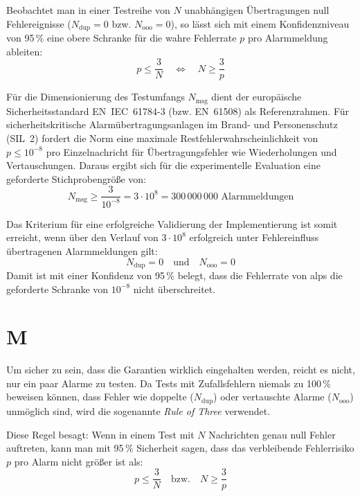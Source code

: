 Beobachtet man in einer Testreihe von $N$ unabhängigen Übertragungen null Fehlereignisse ($N_{\text{dup}} = 0$ bzw. $N_{\text{ooo}} = 0$), so lässt sich mit einem Konfidenzniveau von 95\,\% eine obere Schranke für die wahre Fehlerrate $p$ pro Alarmmeldung ableiten:
\begin{equation}
    p \le \frac{3}{N} \quad \Longleftrightarrow \quad N \ge \frac{3}{p}
\end{equation}

Für die Dimensionierung des Testumfangs $N_{\text{msg}}$ dient der europäische Sicherheitsstandard \mbox{EN IEC 61784-3} (bzw. \mbox{EN 61508}) als Referenzrahmen. Für sicherheitskritische Alarmübertragungsanlagen im Brand- und Personenschutz (\mbox{SIL 2}) fordert die Norm eine maximale Restfehlerwahrscheinlichkeit von $p \le 10^{-8}$ pro Einzelnachricht für Übertragungsfehler wie Wiederholungen und Vertauschungen. Daraus ergibt sich für die experimentelle Evaluation eine geforderte Stichprobengröße von:
\begin{equation}
    N_{\text{msg}} \ge \frac{3}{10^{-8}} = 3 \cdot 10^{8} = 300\,000\,000 \text{ Alarmmeldungen}
\end{equation}

Das Kriterium für eine erfolgreiche Validierung der Implementierung ist somit erreicht, wenn über den Verlauf von $3 \cdot 10^8$ erfolgreich unter Fehlereinfluss übertragenen Alarmmeldungen gilt:
\begin{equation}
    N_{\text{dup}} = 0 \quad \text{und} \quad N_{\text{ooo}} = 0
\end{equation}
Damit ist mit einer Konfidenz von 95\,\% belegt, dass die Fehlerrate von \gls{alps} die geforderte Schranke von $10^{-8}$ nicht überschreitet.

\chapter{M}
Um sicher zu sein, dass die Garantien wirklich eingehalten werden, reicht es nicht, nur ein paar Alarme zu testen. Da Tests mit Zufallsfehlern niemals zu 100\,\% beweisen können, dass Fehler wie doppelte ($N_{\text{dup}}$) oder vertauschte Alarme ($N_{\text{ooo}}$) unmöglich sind, wird die sogenannte \textit{Rule of Three} verwendet.

Diese Regel besagt: Wenn in einem Test mit $N$ Nachrichten genau null Fehler auftreten, kann man mit 95\,\% Sicherheit sagen, dass das verbleibende Fehlerrisiko $p$ pro Alarm nicht größer ist als:
\begin{equation}
    p \le \frac{3}{N} \quad \text{bzw.} \quad N \ge \frac{3}{p}
\end{equation}

